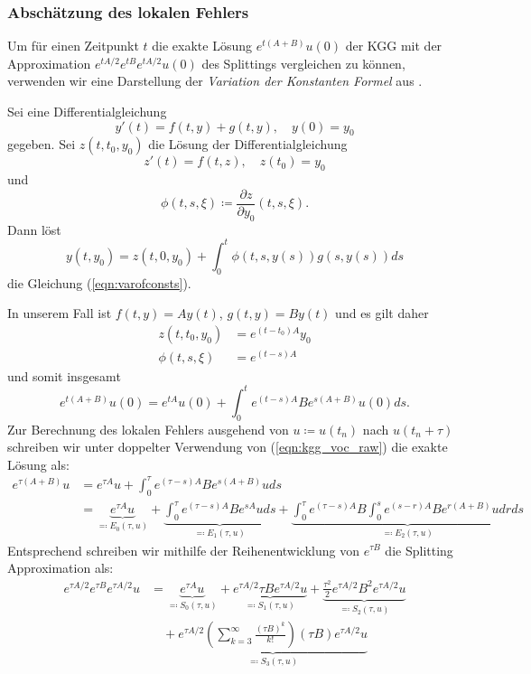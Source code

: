 \subsubsection*{Abschätzung des lokalen Fehlers}
Um für einen Zeitpunkt $t$ die exakte Lösung $e^{t(A+B)}u(0)$ der KGG mit der Approximation $e^{tA/2}e^{tB}e^{tA/2}u(0)$ des Splittings vergleichen zu können, verwenden wir eine Darstellung der \emph{Variation der Konstanten Formel} aus \autocite{carassco2007}.
\begin{maththeorem}
\label{th:varofconstantsalkeseev}
Sei eine Differentialgleichung 
\begin{equation}
\label{eqn:varofconsts}
y'(t)=f(t,y)+g(t,y),\quad y(0)=y_0
\end{equation}
gegeben. Sei $z(t,t_0,y_0)$ die Lösung der Differentialgleichung 
\[z'(t)=f(t,z), \quad z(t_0)=y_0\]
und
\[\phi(t,s,\xi)\coloneqq\frac{\partial z}{\partial y_0}(t,s,\xi).\]
Dann löst
\[y(t,y_0)=z(t,0,y_0)+\int_0^t\phi(t,s,y(s))g(s,y(s))ds\]
die Gleichung (\ref{eqn:varofconsts}).
\end{maththeorem}
In unserem Fall ist $f(t,y)=Ay(t)$, $g(t,y)=By(t)$ und es gilt daher
\begin{align*}
z(t,t_0,y_0)&=e^{(t-t_0)A}y_0\\
\phi(t,s,\xi)&=e^{(t-s)A}
\end{align*}
und somit insgesamt
\begin{equation}
\label{eqn:kgg_voc_raw}
e^{t(A+B)}u(0)=e^{tA}u(0)+\int_0^te^{(t-s)A}Be^{s(A+B)}u(0)ds.
\end{equation}
Zur Berechnung des lokalen Fehlers ausgehend von $u\coloneqq u(t_n)$ nach $u(t_n+\tau)$ schreiben wir unter doppelter Verwendung von (\ref{eqn:kgg_voc_raw}) die exakte Lösung als:
\begin{equation}
\begin{split}
e^{\tau(A+B)}u&=e^{\tau A}u+\int_0^\tau e^{(\tau - s)A}Be^{s(A+B)}uds\\
&=\underbrace{e^{\tau A}u}_{\eqqcolon E_0(\tau,u)}+\underbrace{\int_0^\tau e^{(\tau - s)A}Be^{sA}uds}_{\eqqcolon E_1(\tau,u)}
+\underbrace{\int_0^\tau e^{(\tau - s)A}B\int_0^s e^{(s-r)A}Be^{r(A+B)}udrds}_{\eqqcolon E_2(\tau, u)}
\end{split}
\end{equation}
Entsprechend schreiben wir mithilfe der Reihenentwicklung von $e^{\tau B}$ die Splitting Approximation als:
\begin{equation}
\begin{split}
e^{\tau A/2}e^{\tau B}e^{\tau A/2}u&=\underbrace{e^{\tau A}u}_{\eqqcolon S_0(\tau,u)}+\underbrace{e^{\tau A/2}\tau Be^{\tau A/2}u}_{\eqqcolon S_1(\tau,u)}+\underbrace{\frac{\tau^2}{2}e^{\tau A/2}B^2e^{\tau A/2}u}_{\eqqcolon S_2(\tau,u)}\\
&\quad +\underbrace{e^{\tau A/2}\left(\sum_{k=3}^\infty \frac{(\tau B)^k}{k!}\right)(\tau B)e^{\tau A/2}u}_{\eqqcolon S_3(\tau,u)}
\end{split}
\end{equation}
